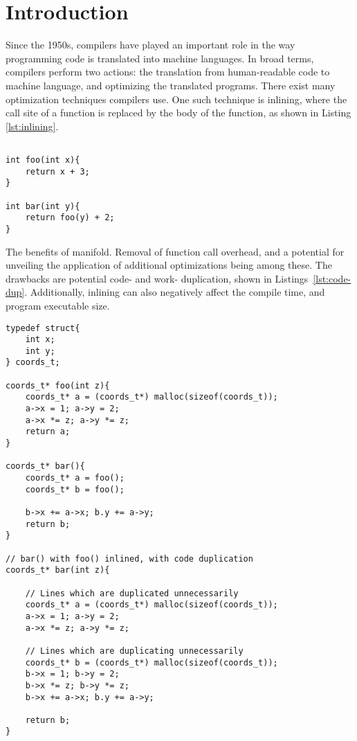 
\section{Introduction}
\label{introduction}

Since the 1950s, compilers have played an important role in the way programming
code is translated into machine languages. In broad terms, compilers perform two
actions: the translation from human-readable code to machine language, and
optimizing the translated programs. There exist many optimization techniques
compilers use. One such technique is inlining, where the call site of a function
is replaced by the body of the function, as shown in Listing \ref{lst:inlining}.

\begin{lstlisting}[label={lst:inlining}, style=customcpp,
caption={Function \textit{foo()} inlined into function \textit{bar()} would
result in the body of \textit{bar()} being \textit{return x + 3 + 2}, in which
case the optimization technique of constant folding is unveiled, permitting the
compiler to replace the expression with its cheaper equivalent: \textit{x +
5}.}]

int foo(int x){
	return x + 3;
}

int bar(int y){
	return foo(y) + 2;
}
\end{lstlisting}

The benefits of manifold. Removal of function call overhead, and a potential for
unveiling the application of additional optimizations being among these. The
drawbacks are potential code- and work- duplication, shown in
Listings~\ref{lst:code-dup}. Additionally, inlining can also negatively affect
the compile time, and program executable size.

\begin{lstlisting}[label={lst:code-dup}, style=customcpp,
caption={Code duplication in \textit{bar()}, when inlining \textit{foo()} into
\textit{bar()}. Total code size (counted by number of statements) for the
functions \textit{foo()} and \textit{bar()} are 11 when not inlined, and 13 when
inlined.}]
typedef struct{
	int x;
	int y;
} coords_t;

coords_t* foo(int z){
	coords_t* a = (coords_t*) malloc(sizeof(coords_t));
	a->x = 1; a->y = 2;
	a->x *= z; a->y *= z;
	return a;
}

coords_t* bar(){
	coords_t* a = foo();
	coords_t* b = foo();

	b->x += a->x; b.y += a->y;
	return b;
}

// bar() with foo() inlined, with code duplication
coords_t* bar(int z){

	// Lines which are duplicated unnecessarily
	coords_t* a = (coords_t*) malloc(sizeof(coords_t));
	a->x = 1; a->y = 2;
	a->x *= z; a->y *= z;

	// Lines which are duplicating unnecessarily
	coords_t* b = (coords_t*) malloc(sizeof(coords_t));
	b->x = 1; b->y = 2;
	b->x *= z; b->y *= z;
	b->x += a->x; b.y += a->y;

	return b;
}
\end{lstlisting}

